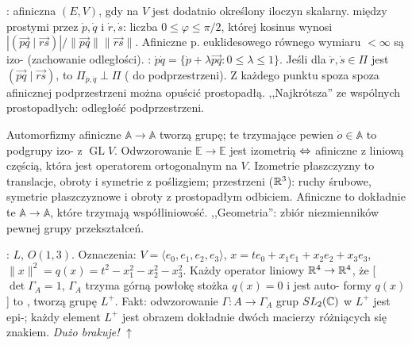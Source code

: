 :  afiniczna $(E, V)$, gdy na $V$ jest dodatnio określony iloczyn skalarny.
 między prostymi przez $\dot p, \dot q$ i $\dot r, \dot s$: liczba $0 \le \varphi \le \pi/2$, której kosinus wynosi $|(\overrightarrow{pq } \mid\overrightarrow{rs})| / \|\overrightarrow{pq}\|\|\overrightarrow{rs}\| $.
Afiniczne p. euklidesowego równego wymiaru $< \infty$ są izo- (zachowanie odległości).
: $\dot p \dot q = \{\dot p + \lambda \overrightarrow{pq} : 0 \le \lambda \le 1\}$.
Jeśli dla $\dot r, \dot s \in \Pi$ jest $(\overrightarrow{p q} \mid \overrightarrow{r s})$, to $\Pi_{\dot p, \dot q} \perp \Pi$ ( do podprzestrzeni).
Z każdego punktu spoza spoza afinicznej podprzestrzeni można opuścić prostopadłą.
,,Najkrótsza'' ze wspólnych prostopadłych: odległość podprzestrzeni.

Automorfizmy  afiniczne $\mathbb A \to \mathbb A$ tworzą grupę; te trzymające pewien $\dot o\in \mathbb A$ to podgrupy izo- z $\operatorname{GL} V$.
Odwzorowanie $\mathbb E \to \mathbb E$ jest izometrią $\Leftrightarrow$ afiniczne z liniową częścią, która jest operatorem ortogonalnym na $V$.
Izometrie płaszczyzny to translacje, obroty i symetrie z poślizgiem; przestrzeni ($\mathbb{R}^3$): ruchy śrubowe, symetrie płaszczyznowe i obroty z prostopadłym odbiciem.
Afiniczne to dokładnie te $\mathbb A \to \mathbb A$, które trzymają współliniowość.
,,Geometria'': zbiór niezmienników pewnej grupy przekształceń.

: $L$, $O(1,3)$.
Oznaczenia: $V= \langle e_0, e_1, e_2, e_3\rangle$, $x = t e_0 + x_1 e_1 + x_2 e_2 + x_3e_3$, $\|x\|^2 = q(x) = t^2-x_1^2 - x_2^2 - x_3^2$.
Każdy operator liniowy $\mathbb{R}^4 \to \mathbb{R}^4$, że [$\det \Gamma_A = 1$, $\Gamma_A$ trzyma górną powłokę stożka $q(x) = 0$ i jest auto- formy $q(x)$] to , tworzą grupę $L^+$.
Fakt: odwzorowanie $\Gamma \colon A \to \Gamma_A$ grup $SL_2(\mathbb{C})$ w $L^+$ jest epi-; każdy element $L^+$ jest obrazem dokładnie dwóch macierzy różniących się znakiem.
\hfill \emph{Dużo brakuje!} $\uparrow$